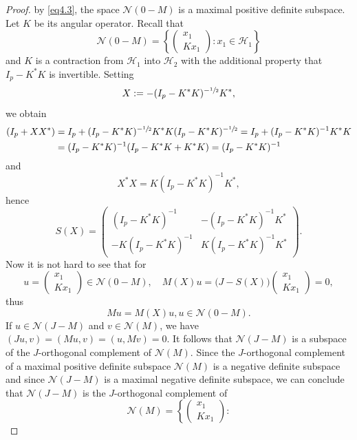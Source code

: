 \documentclass[12pt, a4paper, reqno, twoside]{amsart}
\numberwithin{equation}{section}
\theoremstyle{definition}
\theoremstyle{remark}
\theoremstyle{mystyle}
\begin{document}
\begin{proof}
by \eqref{eq4.3}, the space $\mathscr N(0-M)$ is a maximal positive
definite subspace. Let $K$ be its angular operator. Recall that
\[
  \mathscr N(0-M) = \left\{
     \begin{pmatrix} x_{1} \\ Kx_{1} \end{pmatrix}
      : x_{1}\in\mathscr H_{1} \right\}
\]  
and $K$ is a contraction from $\mathscr H_{1}$ into $\mathscr H_{2}$
with the additional property that $I_{p}-K^{\ast}K$ is invertible.
Setting
\[
X:=-(I_{p}-K^{\ast}K)^{-\sfrac{1}{2}}K^{\ast},
\]
we obtain
\begin{align*}
(I_{p}+XX^{\ast}) & =
  I_{p}+(I_{p}-K^{\ast}K)^{-\sfrac{1}{2}}K^{\ast}K
  (I_{p}-K^{\ast}K)^{-\sfrac{1}{2}} 
   = I_{p} + (I_{p}-K^{\ast}K)^{-1} K^{\ast}K \\                    
 & = (I_{p}-K^{\ast}K)^{-1}(I_{p}-K^{\ast}K + K^{\ast}K)
   = (I_{p}-K^{\ast}K)^{-1}
\end{align*}  
and 
\[
X^{\ast}X = K(I_{p}-K^{\ast}K)^{-1}K^{\ast},
\]
hence   
\[
  S(X)=
  \begin{pmatrix}
    (I_{p}-K^{\ast}K)^{-1}    & -(I_{p}-K^{\ast}K)^{-1}K^{\ast} \\
    -K (I_{p}-K^{\ast}K)^{-1} & K (I_{p}-K^{\ast}K)^{-1} K^{\ast}
  \end{pmatrix}.
\]
Now it is not hard to see that for 
\[
u = \begin{pmatrix} x_{1} \\ K x_{1} \end{pmatrix}
    \in\mathscr N(0-M),\quad
M(X)u = \bigl(J-S(X)\bigr) \begin{pmatrix} x_{1} \\ K x_{1} \end{pmatrix}=0,
\]  
thus
\begin{equation}
\label{eq5.5} 
  Mu = M(X)u, u\in\mathscr N(0-M).
\end{equation}
If $u\in\mathscr N(J-M)$ and $v\in\mathscr N(M)$, we have
$(Ju,v)=(Mu,v)=(u,Mv)=0$. It follows that $\mathscr N(J-M)$ is a
subspace of the $J$-orthogonal complement of $\mathscr N(M)$. Since
the $J$-orthogonal complement of a maximal positive definite subspace
$\mathscr N(M)$ is a negative definite subspace and since $\mathscr
N(J-M)$ is a maximal negative definite subspace, we can conclude
that $\mathscr N(J-M)$ is the $J$-orthogonal complement of
\[
 \mathscr N(M) =
 \left\{ \begin{pmatrix} x_{1}\\ K x_{1} \end{pmatrix} :
\]
\end{proof}
\end{document}
